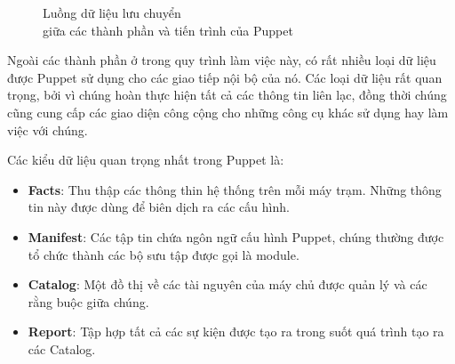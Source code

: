 \begin{figure}[h!]
    \begin{center}
    \end{center}
    \caption{Luồng dữ liệu lưu chuyển \\ giữa các thành phần và tiến trình của Puppet}
    \label{fig:puppet_timing_diagram}
\end{figure}

Ngoài các thành phần ở trong quy trình làm việc này, có rất nhiều loại dữ liệu được Puppet sử dụng cho các giao tiếp nội bộ của nó. Các loại dữ liệu rất quan trọng, bởi vì chúng hoàn thực hiện tất cả các thông tin liên lạc, đồng thời chúng cũng cung cấp các giao diện công cộng cho những công cụ khác sử dụng hay làm việc với chúng.

\newpage
\clearpage
Các kiểu dữ liệu quan trọng nhất trong Puppet là:

\begin{itemize}
\item \textbf{Facts}: Thu thập các thông thin hệ thống trên mỗi máy trạm. Những thông tin này được dùng để biên dịch ra các cấu hình.

\item \textbf{Manifest}: Các tập tin chứa ngôn ngữ cấu hình Puppet, chúng thường được tổ chức thành các bộ sưu tập được gọi là module.

\item \textbf{Catalog}: Một đồ thị về các tài nguyên của máy chủ được quản lý và các rằng buộc giữa chúng.

\item \textbf{Report}: Tập hợp tất cả các sự kiện được tạo ra trong suốt quá trình tạo ra các Catalog.
\end{itemize}

